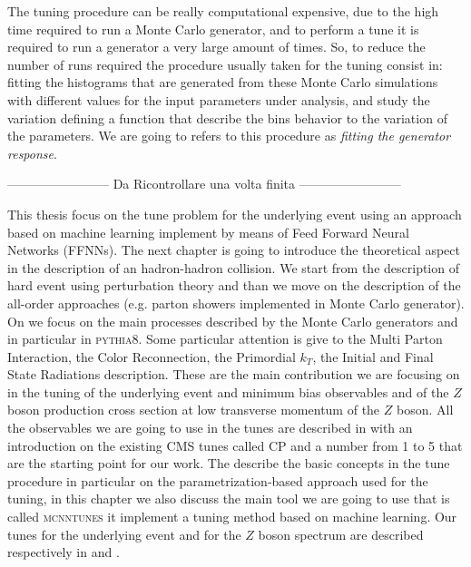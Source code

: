 The tuning procedure can be really computational expensive, due to the high time required to run a Monte Carlo generator, and to perform a tune it is required to run a generator a very large amount of times. So, to reduce the number of runs required the procedure usually taken for the tuning consist in: fitting the histograms that are generated from these Monte Carlo simulations with different values for the input parameters under analysis, and study the variation defining a function that describe the bins behavior to the variation of the parameters. We are going to refers to this procedure as \textit{fitting the generator response}.


------------------------ Da Ricontrollare una volta finita ------------------------

This thesis focus on the tune problem for the underlying event using an approach based on machine learning implement by means of Feed Forward Neural Networks (FFNNs). 
The next chapter is going to introduce the theoretical aspect in the description of an hadron-hadron collision. We start from the description of hard event using perturbation theory and than we move on the description of the all-order approaches (e.g. parton showers implemented in Monte Carlo generator). On   we focus on the main processes described by the Monte Carlo generators and in particular in \textsc{pythia8}. Some particular attention is give to the Multi Parton Interaction, the Color Reconnection, the Primordial $k_T$, the Initial and Final State Radiations description. These are the main contribution we are focusing on in the tuning of the underlying event and minimum bias observables and of the $Z$ boson production cross section at low transverse momentum of the $Z$ boson. All the observables we are going to use in the tunes are described in  with an introduction on the existing CMS tunes called CP and a number from 1 to 5 that are the starting point for our work. The  describe the basic concepts in the tune procedure in particular on the parametrization-based approach used for the tuning, in this chapter we also discuss the main tool we are going to use that is called \textsc{mcnntunes} it implement a tuning method based on machine learning. Our tunes for the underlying event and for the $Z$ boson spectrum are described respectively in  and .
 